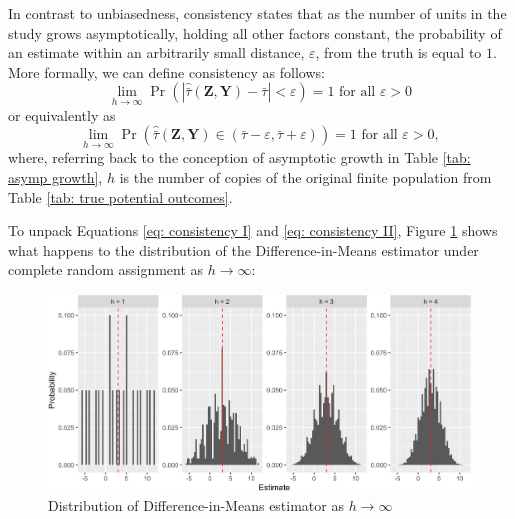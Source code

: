 \documentclass[12pt,leqno]{article}
\theoremstyle{newstyle}
\begin{document}
In contrast to unbiasedness, consistency states that as the number of
units in the study grows asymptotically, holding all other factors
constant, the probability of an estimate within an arbitrarily small
distance, \(\varepsilon\), from the truth is equal to \(1\). More
formally, we can define consistency as follows: \begin{equation}
\lim_{h \to \infty} \Pr\left(\left\lvert \hat{\bar{\tau}}\left(\mathbf{Z}, \mathbf{Y}\right) - \bar{\tau} \right\rvert < \varepsilon \right) = 1 \text{ for all } \varepsilon > 0
\label{eq: consistency I}
\end{equation} or equivalently as \begin{equation}
\lim_{h \to \infty} \Pr\left(\hat{\bar{\tau}}\left(\mathbf{Z}, \mathbf{Y}\right) \in \left(\bar{\tau} - \varepsilon, \bar{\tau} + \varepsilon\right)\right) = 1 \text{ for all } \varepsilon > 0,
\label{eq: consistency II}
\end{equation} where, referring back to the conception of asymptotic
growth in Table \ref{tab: asymp growth}, \(h\) is the number of copies
of the original finite population from Table
\ref{tab: true potential outcomes}.

To unpack Equations \ref{eq: consistency I} and
\ref{eq: consistency II}, Figure \ref{fig: asymp dists diff-means est}
shows what happens to the distribution of the Difference-in-Means
estimator under complete random assignment as \(h \to \infty\):

\begin{figure}[H]
\includegraphics[width=\linewidth]{asymp_ests_plot.jpg}
\caption{Distribution of Difference-in-Means estimator as $h \to \infty$}
\label{fig: asymp dists diff-means est}
\end{figure}
\end{document}

